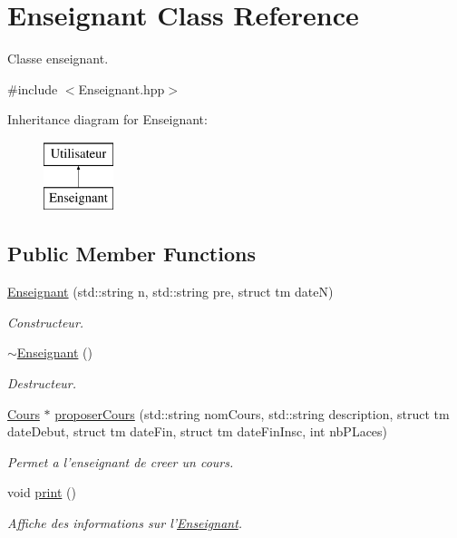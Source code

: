 \hypertarget{classEnseignant}{\section{Enseignant Class Reference}
\label{classEnseignant}
}


Classe enseignant.  




{\ttfamily \#include $<$Enseignant.\-hpp$>$}

Inheritance diagram for Enseignant\-:\begin{figure}[H]
\begin{center}
\leavevmode
\includegraphics[height=2.000000cm]{classEnseignant}
\end{center}
\end{figure}
\subsection*{Public Member Functions}
\begin{DoxyCompactItemize}
\item 
\hyperlink{classEnseignant_a349f455fe0fbf43a884e2f8a21f057d7}{Enseignant} (std\-::string n, std\-::string pre, struct tm date\-N)
\begin{DoxyCompactList}\small\item\em Constructeur. \end{DoxyCompactList}\item 
\hyperlink{classEnseignant_a9317ba87e8b7e32fa5e48bdbff1c9cce}{$\sim$\-Enseignant} ()
\begin{DoxyCompactList}\small\item\em Destructeur. \end{DoxyCompactList}\item 
\hyperlink{classCours}{Cours} $\ast$ \hyperlink{classEnseignant_a5c39655711ebda90f8568be84fe64872}{proposer\-Cours} (std\-::string nom\-Cours, std\-::string description, struct tm date\-Debut, struct tm date\-Fin, struct tm date\-Fin\-Insc, int nb\-P\-Laces)
\begin{DoxyCompactList}\small\item\em Permet a l'enseignant de creer un cours. \end{DoxyCompactList}\item 
\hypertarget{classEnseignant_af86bb8ab32afabe18507ce5788370c3d}{void \hyperlink{classEnseignant_af86bb8ab32afabe18507ce5788370c3d}{print} ()}\label{classEnseignant_af86bb8ab32afabe18507ce5788370c3d}

\begin{DoxyCompactList}\small\item\em Affiche des informations sur l'\hyperlink{classEnseignant}{Enseignant}. \end{DoxyCompactList}\end{DoxyCompactItemize}
